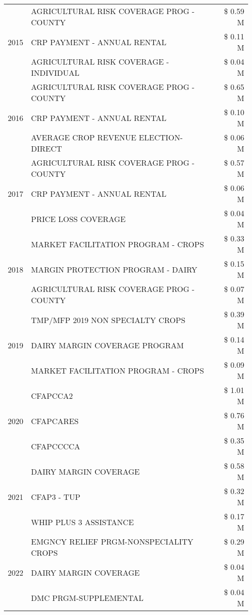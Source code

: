 \begin{tabular}{llr}
\cline{1-3}
\multirow[t]{3}{*}{2015} & AGRICULTURAL RISK COVERAGE PROG - COUNTY & \$ 0.59 M \\
 & CRP PAYMENT - ANNUAL RENTAL & \$ 0.11 M \\
 & AGRICULTURAL RISK COVERAGE - INDIVIDUAL & \$ 0.04 M \\
\cline{1-3}
\multirow[t]{3}{*}{2016} & AGRICULTURAL RISK COVERAGE PROG - COUNTY & \$ 0.65 M \\
 & CRP PAYMENT - ANNUAL RENTAL & \$ 0.10 M \\
 & AVERAGE CROP REVENUE ELECTION-DIRECT & \$ 0.06 M \\
\cline{1-3}
\multirow[t]{3}{*}{2017} & AGRICULTURAL RISK COVERAGE PROG - COUNTY & \$ 0.57 M \\
 & CRP PAYMENT - ANNUAL RENTAL & \$ 0.06 M \\
 & PRICE LOSS COVERAGE & \$ 0.04 M \\
\cline{1-3}
\multirow[t]{3}{*}{2018} & MARKET FACILITATION PROGRAM - CROPS & \$ 0.33 M \\
 & MARGIN PROTECTION PROGRAM - DAIRY & \$ 0.15 M \\
 & AGRICULTURAL RISK COVERAGE PROG - COUNTY & \$ 0.07 M \\
\cline{1-3}
\multirow[t]{3}{*}{2019} & TMP/MFP 2019 NON SPECIALTY CROPS & \$ 0.39 M \\
 & DAIRY MARGIN COVERAGE PROGRAM & \$ 0.14 M \\
 & MARKET FACILITATION PROGRAM - CROPS & \$ 0.09 M \\
\cline{1-3}
\multirow[t]{3}{*}{2020} & CFAPCCA2 & \$ 1.01 M \\
 & CFAPCARES & \$ 0.76 M \\
 & CFAPCCCCA & \$ 0.35 M \\
\cline{1-3}
\multirow[t]{3}{*}{2021} & DAIRY MARGIN COVERAGE & \$ 0.58 M \\
 & CFAP3 - TUP & \$ 0.32 M \\
 & WHIP PLUS 3 ASSISTANCE & \$ 0.17 M \\
\cline{1-3}
\multirow[t]{3}{*}{2022} & EMGNCY RELIEF PRGM-NONSPECIALITY CROPS & \$ 0.29 M \\
 & DAIRY MARGIN COVERAGE & \$ 0.04 M \\
 & DMC PRGM-SUPPLEMENTAL & \$ 0.04 M \\
\cline{1-3}
\bottomrule
\end{tabular}
